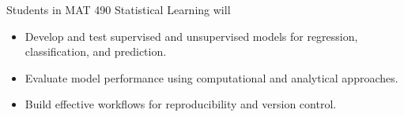 Students in MAT 490 Statistical Learning will
\begin{itemize}
 	\item Develop and test  supervised and unsupervised models for regression, classification, and prediction.
	\item Evaluate model performance using computational and analytical approaches.
	\item Build effective workflows for reproducibility and version control.
	 \end{itemize}